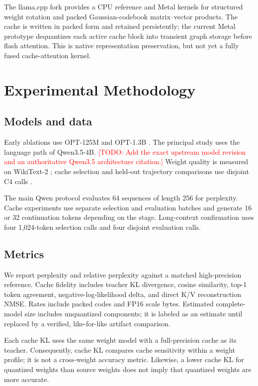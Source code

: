 \documentclass[10pt,twocolumn]{article}
\newcommand{\todo}[1]{\textcolor{red}{[TODO: #1]}}
\begin{document}
The llama.cpp fork provides a CPU reference and Metal kernels for structured
weight rotation and packed Gaussian-codebook matrix--vector products. The
cache is written in packed form and retained persistently; the current Metal
prototype dequantizes each active cache block into transient graph storage
before flash attention. This is native representation preservation, but not yet
a fully fused cache-attention kernel.

\section{Experimental Methodology}

\subsection{Models and data}

Early ablations use OPT-125M and OPT-1.3B \cite{zhang2022opt}. The principal
study uses the language path of Qwen3.5-4B. \todo{Add the exact upstream model
revision and an authoritative Qwen3.5 architecture citation.} Weight quality is
measured on WikiText-2 \cite{merity2016wikitext}; cache selection and held-out
trajectory comparisons use disjoint C4 calls \cite{raffel2020t5,dodge2021c4}.

The main Qwen protocol evaluates 64 sequences of length 256 for perplexity.
Cache experiments use separate selection and evaluation batches and generate
16 or 32 continuation tokens depending on the stage. Long-context confirmation
uses four 1,024-token selection calls and four disjoint evaluation calls.

\subsection{Metrics}

We report perplexity and relative perplexity against a matched high-precision
reference. Cache fidelity includes teacher KL divergence, cosine similarity,
top-1 token agreement, negative-log-likelihood delta, and direct K/V
reconstruction NMSE. Rates include packed codes and FP16 scale bytes. Estimated
complete-model size includes unquantized components; it is labeled as an
estimate until replaced by a verified, like-for-like artifact comparison.

Each cache KL uses the same weight model with a full-precision cache as its
teacher. Consequently, cache KL compares cache sensitivity within a weight
profile; it is not a cross-weight accuracy metric. Likewise, a lower cache KL
for quantized weights than source weights does not imply that quantized weights
are more accurate.
\end{document}
